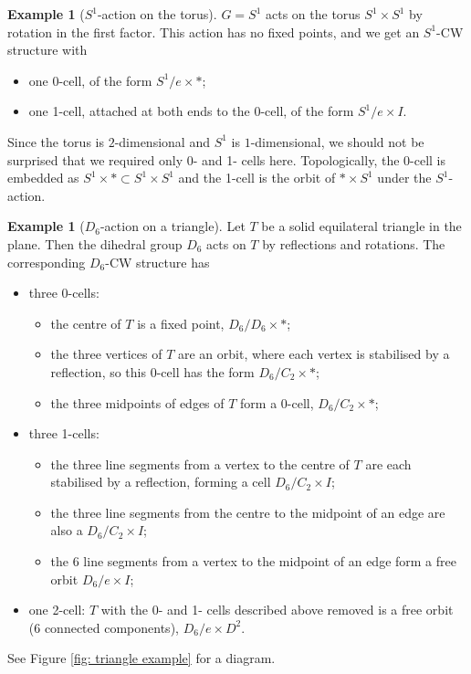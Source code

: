 \documentclass{amsart}
\theoremstyle{definition}
\newtheorem{example}[thm]{Example}
\numberwithin{thm}{section}
\begin{document}
\begin{example}[$S^1$-action on the torus]
    $G = S^1$ acts on the torus $S^1 \times S^1$ by rotation in the first factor. This action has no fixed points, and we get an $S^1$-CW structure with
    \begin{itemize}
        \item one 0-cell, of the form $S^1/e \times *$;
        \item one 1-cell, attached at both ends to the 0-cell, of the form $S^1/e \times I$.
      \end{itemize}
      Since the torus is $2$-dimensional and $S^1$ is $1$-dimensional, we should not be surprised that we required only 0- and 1- cells here. Topologically, the 0-cell is embedded as $S^1 \times * \subset S^1 \times S^1$ and the 1-cell is the orbit of $* \times S^1$ under the $S^1$-action. 
\end{example}

\begin{example}[$D_6$-action on a triangle]
    Let $T$ be a solid equilateral triangle in the plane. Then the dihedral group $D_6$ acts on $T$ by reflections and rotations. The corresponding $D_6$-CW structure has
    \begin{itemize}
        \item three 0-cells:
        \begin{itemize}
            \item the centre of $T$ is a fixed point, $D_6/D_6 \times *$;
            \item the three vertices of $T$ are an orbit, where each vertex is stabilised by a reflection, so this 0-cell has the form $D_6/C_2 \times *$;
            \item the three midpoints of edges of $T$ form a $0$-cell, $D_6/C_2 \times *$;
        \end{itemize}
        \item three 1-cells:
        \begin{itemize}
            \item the three line segments from a vertex to the centre of $T$ are each stabilised by a reflection, forming a cell $D_6/C_2 \times I$;
            \item the three line segments from the centre to the midpoint of an edge are also a $D_6/C_2 \times I$;
            \item the 6 line segments from a vertex to the midpoint of an edge form a free orbit $D_6/e \times I$;
        \end{itemize}
        \item one 2-cell: $T$ with the 0- and 1- cells described above removed is a free orbit (6 connected components), $D_6/e \times D^2$.
    \end{itemize}
    See Figure \ref{fig: triangle example} for a diagram.
\end{example}
\end{document}
